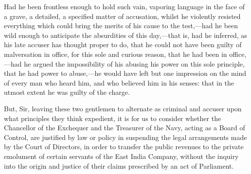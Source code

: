 Had he been frontless enough to hold such vain, vaporing language in the face of a grave, a detailed, a specified matter of accusation, whilst he violently resisted everything which could bring the merits of his cause to the test,—had he been wild enough to anticipate the absurdities of this day,—that is, had he inferred, as his late accuser has thought proper to do, that he could not have been guilty of malversation in office, for this sole and curious reason, that he had been in office,—had he argued the impossibility of his abusing his power on this sole principle, that he had power to abuse,—he would have left but one impression on the mind of every man who heard him, and who believed him in his senses: that in the utmost extent he was guilty of the charge.

But, Sir, leaving these two gentlemen to alternate as criminal and accuser upon what principles they think expedient, it is for us to consider whether the Chancellor of the Exchequer and the Treasurer of the Navy, acting as a Board of Control, are justified by law or policy in suspending the legal arrangements made by the Court of Directors, in order to transfer the public revenues to the private emolument of certain servants of the East India Company, without the inquiry into the origin and justice of their claims prescribed by an act of Parliament.

